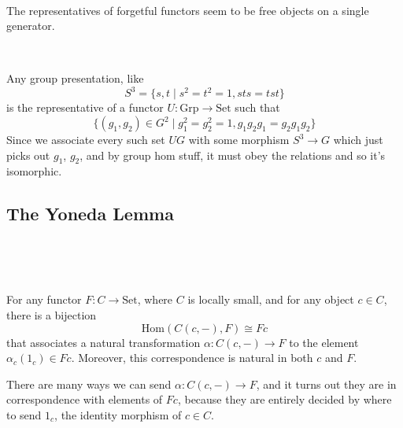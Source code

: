 \documentclass{article}
\begin{document}
\begin{remark}
\

The representatives of forgetful functors seem to be free objects on a single generator. 
\end{remark}

\begin{example}
\

Any group presentation, like $$S^3 = \{s,t \mid s^2 = t^2 = 1, sts = tst\}$$is the representative of a functor $U: \text{Grp} \to \text{Set}$ such that $$\{(g_1, g_2) \in G^2 \mid g_1^2 = g_2^2 = 1, g_1g_2g_1 = g_2g_1g_2\}$$Since we associate every such set $UG$ with some morphism $S^3 \to G$ which just picks out $g_1$, $g_2$, and by group hom stuff, it must obey the relations and so it's isomorphic.
\end{example}

\subsection{The Yoneda Lemma}
\

\begin{lemma}
\

For any functor $F: C \to \text{Set}$, where $C$ is locally small, and for any object $c \in C$, there is a bijection $$\text{Hom}(C(c,-), F) \cong Fc$$that associates a natural transformation $\alpha: C(c, -) \to F$ to the element $\alpha_c(1_c) \in Fc$. Moreover, this correspondence is natural in both $c$ and $F$.  

There are many ways we can send $\alpha: C(c,-) \to F$, and it turns out they are in correspondence with elements of $Fc$, because they are entirely decided by where to send $1_c$, the identity morphism of $c \in C$. 	
\end{lemma}
\end{document}
